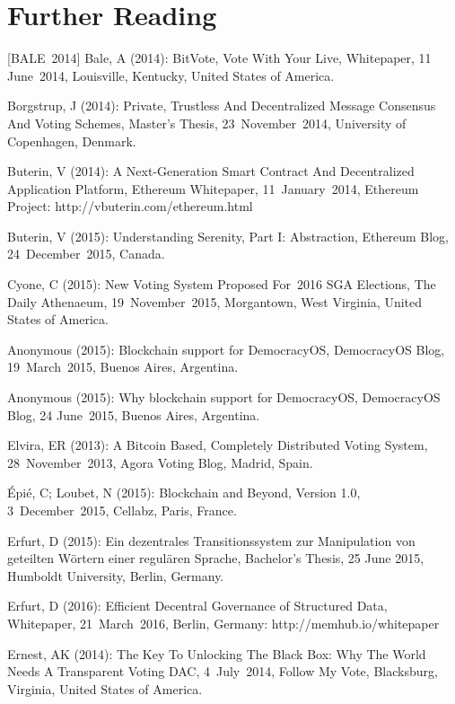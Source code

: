 

\section{Further Reading}
[BALE~2014] Bale, A (2014): BitVote, Vote With Your Live, Whitepaper, 11 June~2014, Louisville, Kentucky, United States of America.\par
[BORGSTRUP~2014] Borgstrup, J (2014): Private, Trustless And Decentralized Message Consensus And Voting Schemes, Master's Thesis, 23~November~2014, University of Copenhagen, Denmark.\par
[BUTERIN~2014] Buterin, V (2014): A Next-Generation Smart Contract And Decentralized Application Platform, Ethereum Whitepaper, 11~January~2014, Ethereum Project: http://vbuterin.com/ethereum.html\par
[BUTERIN~2015] Buterin, V (2015): Understanding Serenity, Part I: Abstraction, Ethereum Blog, 24~December~2015, Canada.\par
[COYNE~2015] Cyone, C (2015): New Voting System Proposed For~2016 SGA Elections, The Daily Athenaeum, 19~November~2015, Morgantown, West Virginia, United States of America.\par
[DEMOCRACYOS~2015A] Anonymous (2015): Blockchain support for DemocracyOS, DemocracyOS Blog, 19~March~2015, Buenos Aires, Argentina.\par
[DEMOCRACYOS~2015B] Anonymous (2015): Why blockchain support for DemocracyOS, DemocracyOS Blog, 24 June~2015, Buenos Aires, Argentina.\par
[ELVIRA~2013] Elvira, ER (2013): A Bitcoin Based, Completely Distributed Voting System, 28~November~2013, Agora Voting Blog, Madrid, Spain.\par
[ÉPIÉ~et~al.~2015] Épié, C; Loubet, N (2015): Blockchain and Beyond, Version 1.0, 3~December~2015, Cellabz, Paris, France.\par
[ERFURT~2015] Erfurt, D (2015): Ein dezentrales Transitionssystem zur Manipulation von geteilten Wörtern einer regulären Sprache, Bachelor's Thesis, 25 June 2015, Humboldt University, Berlin, Germany.\par
[ERFURT~2016] Erfurt, D (2016): Efficient Decentral Governance of Structured Data, Whitepaper, 21~March~2016, Berlin, Germany: http://memhub.io/whitepaper\par
[ERNEST~2014] Ernest, AK (2014): The Key To Unlocking The Black Box: Why The World Needs A Transparent Voting DAC, 4~July~2014, Follow My Vote, Blacksburg, Virginia, United States of America.\par

